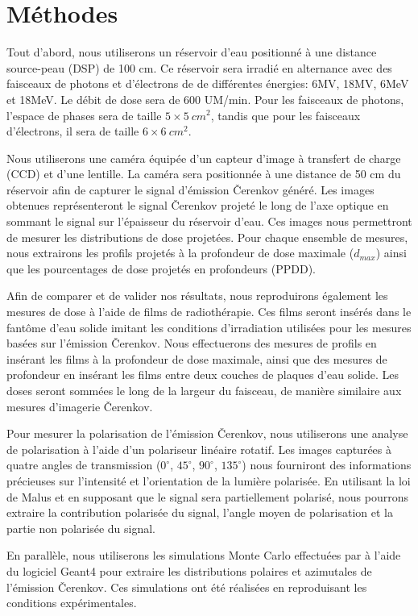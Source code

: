 \documentclass{Thesis}
\begin{document}
\section*{Méthodes}
Tout d'abord, nous utiliserons un réservoir d'eau positionné à une distance source-peau (DSP) de 100 cm.
Ce réservoir sera irradié en alternance avec des faisceaux de photons et d'électrons de de différentes énergies: 6MV, 18MV, 6MeV et 18MeV.
Le débit de dose sera de 600 UM/min.
Pour les faisceaux de photons, l'espace de phases sera de taille $5 \times \SI{5}{cm^2}$, tandis que pour les faisceaux d'électrons, il sera de taille $6 \times \SI{6}{cm^2}$.

Nous utiliserons une caméra équipée d'un capteur d'image à transfert de charge (CCD) et d'une lentille.
La caméra sera positionnée à une distance de 50 cm du réservoir afin de capturer le signal d'émission Čerenkov généré.
Les images obtenues représenteront le signal Čerenkov projeté le long de l'axe optique en sommant le signal sur l'épaisseur du réservoir d'eau.
Ces images nous permettront de mesurer les distributions de dose projetées.
Pour chaque ensemble de mesures, nous extrairons les profils projetés à la profondeur de dose maximale ($d_{max}$) ainsi que les pourcentages de dose projetés en profondeurs (PPDD).

Afin de comparer et de valider nos résultats, nous reproduirons également les mesures de dose à l'aide de films de radiothérapie.
Ces films seront insérés dans le fantôme d'eau solide imitant les conditions d'irradiation utilisées pour les mesures basées sur l'émission Čerenkov.
Nous effectuerons des mesures de profils en insérant les films à la profondeur de dose maximale, ainsi que des mesures de profondeur en insérant les films entre deux couches de plaques d'eau solide.
Les doses seront sommées le long de la largeur du faisceau, de manière similaire aux mesures d'imagerie Čerenkov.

Pour mesurer la polarisation de l'émission Čerenkov, nous utiliserons une analyse de polarisation à l'aide d'un polariseur linéaire rotatif.
Les images capturées à quatre angles de transmission ($0^\circ$, $45^\circ$, $90^\circ$, $135^\circ$) nous fourniront des informations précieuses sur l'intensité et l'orientation de la lumière polarisée.
En utilisant la loi de Malus et en supposant que le signal sera partiellement polarisé, nous pourrons extraire la contribution polarisée du signal, l'angle moyen de polarisation et la partie non polarisée du signal.

En parallèle, nous utiliserons les simulations Monte Carlo effectuées par  à l'aide du logiciel Geant4 pour extraire les distributions polaires et azimutales de l'émission Čerenkov.
Ces simulations ont été réalisées en reproduisant les conditions expérimentales.
\end{document}
